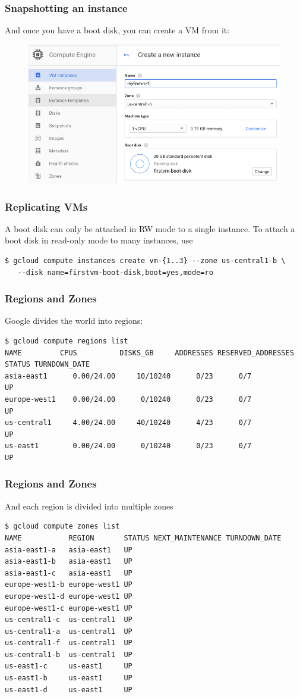 \documentclass[9pt]{beamer}
\begin{document}
\begin{frame}[fragile]
  \frametitle{Snapshotting an instance}
  And once you have a boot disk, you can create a VM from it:
  \begin{figure}
    \includegraphics[scale=0.3]{figures/VMFromBootDisk.png}
  \end{figure}
\end{frame}

\begin{frame}[fragile]
  \frametitle{Replicating VMs}
  A boot disk can only be attached in RW mode to a single instance. To attach a boot disk in read-only mode to many instances, use
  \begin{verbatim}
$ gcloud compute instances create vm-{1..3} --zone us-central1-b \
   --disk name=firstvm-boot-disk,boot=yes,mode=ro
  \end{verbatim}
\end{frame}

\begin{frame}[fragile]
  \frametitle{Regions and Zones}
  Google divides the world into regions:
  \begin{verbatim}
$ gcloud compute regions list
NAME         CPUS          DISKS_GB     ADDRESSES RESERVED_ADDRESSES STATUS TURNDOWN_DATE
asia-east1      0.00/24.00     10/10240      0/23      0/7           UP
europe-west1    0.00/24.00      0/10240      0/23      0/7           UP
us-central1     4.00/24.00     40/10240      4/23      0/7           UP
us-east1        0.00/24.00      0/10240      0/23      0/7           UP
  \end{verbatim}
\end{frame}

\begin{frame}[fragile]
  \frametitle{Regions and Zones}
  And each region is divided into multiple zones
\begin{verbatim}
$ gcloud compute zones list
NAME           REGION       STATUS NEXT_MAINTENANCE TURNDOWN_DATE
asia-east1-a   asia-east1   UP
asia-east1-b   asia-east1   UP
asia-east1-c   asia-east1   UP
europe-west1-b europe-west1 UP
europe-west1-d europe-west1 UP
europe-west1-c europe-west1 UP
us-central1-c  us-central1  UP
us-central1-a  us-central1  UP
us-central1-f  us-central1  UP
us-central1-b  us-central1  UP
us-east1-c     us-east1     UP
us-east1-b     us-east1     UP
us-east1-d     us-east1     UP
\end{verbatim}
\end{frame}
\end{document}
